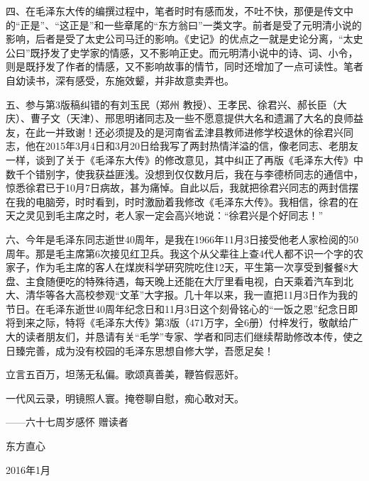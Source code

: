 \documentclass[../../dazhuan.tex]{subfiles}
\begin{document}
四、在毛泽东大传的编撰过程中，笔者时时有感而发，不吐不快，那便是传文中的“正是”、“这正是”和一些章尾的“东方翁曰”一类文字。前者是受了元明清小说的影响，后者是受了太史公司马迁的影响。《史记》的优点之一就是史论分离，“太史公曰”既抒发了史学家的情感，又不影响正史。而元明清小说中的诗、词、小令，则是既抒发了作者的情感，又不影响故事的情节，同时还增加了一点可读性。笔者自幼读书，深有感受，东施效颦，并非故意卖弄也。

五、参与第3版稿纠错的有刘玉民（郑州 教授）、王孝民、徐君兴、郝长臣（大庆）、曹子文（天津）、邢思明诸同志及一些不愿意提供大名和遗漏了大名的良师益友，在此一并致谢！还必须提及的是河南省孟津县教师进修学校退休的徐君兴同志，他在2015年3月4日和3月20日给我写了两封热情洋溢的信，像老同志、老朋友一样，谈到了关于《毛泽东大传》的修改意见，其中纠正了再版《毛泽东大传》中数千个错别字，使我获益匪浅。没想到仅仅数月后，我在与李德桥同志的通信中，惊悉徐君已于10月7日病故，甚为痛悼。自此以后，我就把徐君兴同志的两封信摆在我的电脑旁，时时看到，时时激励着我修改《毛泽东大传》。我相信，徐君的在天之灵见到毛主席之时，老人家一定会高兴地说：“徐君兴是个好同志！”

六、今年是毛泽东同志逝世40周年，是我在1966年11月3日接受他老人家检阅的50周年。那是毛主席第6次接见红卫兵。我这个从父辈往上查4代人都不识一个字的农家子，作为毛主席的客人在煤炭科学研究院吃住12天，平生第一次享受到餐餐8大盘、主食随便吃的特殊待遇，每天晚上还能在大厅里看电视，白天乘着汽车到北大、清华等各大高校参观“文革”大字报。几十年以来，我一直把11月3日作为我的节日。在毛泽东逝世40周年纪念日和11月3日这个刻骨铭心的“一饭之恩”纪念日即将到来之际，特将《毛泽东大传》第3版（471万字，全6册）付梓发行，敬献给广大的读者朋友们，并恳请有关“毛学”专家、学者和同志们继续帮助修改本传，使之日臻完善，成为没有校园的毛泽东思想自修大学，吾愿足矣！

\kaishu
立言五百万，坦荡无私偏。歌颂真善美，鞭笞假恶奸。

一代风云录，明镜照人寰。掩卷聊自慰，痴心敢对天。

\hfil ——六十七周岁感怀 赠读者
\normalfont

\begin{sign}
	东方直心
	
	2016年1月
\end{sign}
\end{document}
